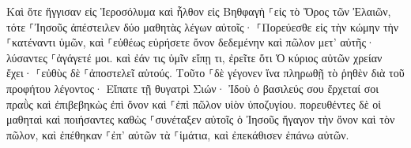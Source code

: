 \documentclass{openreader}
\begin{document}
Καὶ ὅτε ἤγγισαν εἰς Ἱεροσόλυμα καὶ ἦλθον εἰς Βηθφαγὴ ⸀εἰς τὸ Ὄρος τῶν Ἐλαιῶν, τότε ⸀Ἰησοῦς ἀπέστειλεν δύο μαθητὰς 
λέγων αὐτοῖς· ⸀Πορεύεσθε εἰς τὴν κώμην τὴν ⸀κατέναντι ὑμῶν, καὶ ⸀εὐθέως εὑρήσετε ὄνον δεδεμένην καὶ πῶλον μετ’ αὐτῆς· λύσαντες ⸀ἀγάγετέ μοι. 
καὶ ἐάν τις ὑμῖν εἴπῃ τι, ἐρεῖτε ὅτι Ὁ κύριος αὐτῶν χρείαν ἔχει· ⸀εὐθὺς δὲ ⸀ἀποστελεῖ αὐτούς. 
Τοῦτο ⸀δὲ γέγονεν ἵνα πληρωθῇ τὸ ῥηθὲν διὰ τοῦ προφήτου λέγοντος· 
Εἴπατε τῇ θυγατρὶ Σιών· Ἰδοὺ ὁ βασιλεύς σου ἔρχεταί σοι πραῢς καὶ ἐπιβεβηκὼς ἐπὶ ὄνον καὶ ⸀ἐπὶ πῶλον υἱὸν ὑποζυγίου. 
πορευθέντες δὲ οἱ μαθηταὶ καὶ ποιήσαντες καθὼς ⸀συνέταξεν αὐτοῖς ὁ Ἰησοῦς 
ἤγαγον τὴν ὄνον καὶ τὸν πῶλον, καὶ ἐπέθηκαν ⸀ἐπ’ αὐτῶν τὰ ⸀ἱμάτια, καὶ ἐπεκάθισεν ἐπάνω αὐτῶν. 
\end{document}
